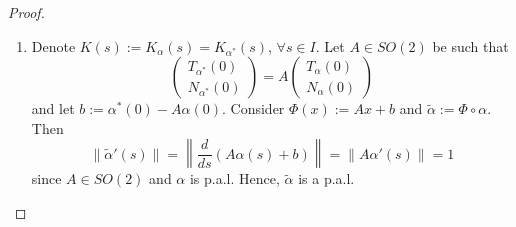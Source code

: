 \begin{proof}
\begin{enumerate}
\noindent Hence, by def, it remains to show that $n(s) = N_\alpha(s)$: Since $\langle t, n\rangle\equiv 0$, then $n(s) = J(t(s))$ or $n(s) = -J(t(s))$, where $J = \begin{pmatrix}0 & -1\\1 & 0\end{pmatrix}$. Note that when $s = 0$, $n(0) = \begin{pmatrix}0 & -1\\1 & 0\end{pmatrix}t(0) = q$, i.e.: the first case holds at $s = 0$. Moreover, note that the function $\|n(s) - \begin{pmatrix}0 & -1\\1 & 0\end{pmatrix}t(s)\|$ is continuous, so we must have
\[
n(s) = \begin{pmatrix}0 & -1\\1 & 0\end{pmatrix}t(s)
\]
Since $T_\alpha(s) := \alpha'(s) = t(s)$, then by def, $n(s) = N_\alpha(s)$.

    \item Denote $K(s) := K_\alpha(s) = K_{\alpha^*}(s)$, $\forall s\in I$. Let $A\in SO(2)$ be such that
\[
\begin{pmatrix}T_{\alpha^*}(0)\\ N_{\alpha^*}(0)\end{pmatrix} = A\begin{pmatrix}T_\alpha(0)\\ N_\alpha(0)\end{pmatrix}
\]
and let $b := \alpha^*(0) - A\alpha(0)$. Consider $\Phi(x) := Ax + b$ and $\tilde{\alpha} := \Phi\circ\alpha$. Then
\[
\|\tilde{\alpha}'(s)\| = \left\|\frac{d}{ds}(A\alpha(s) + b)\right\| = \|A\alpha'(s)\| = 1
\]
since $A\in SO(2)$ and $\alpha$ is p.a.l. Hence, $\tilde{\alpha}$ is a p.a.l.


\end{enumerate}
\end{proof}
